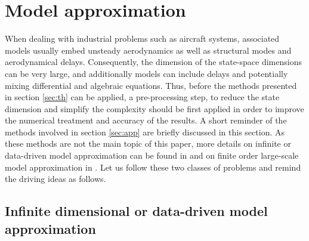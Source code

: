 \documentclass[graybox]{svmult}
\begin{document}
\section{Model approximation}\label{sec:mr}

When dealing with industrial problems such as aircraft systems, associated models usually embed unsteady aerodynamics as well as structural modes and aerodynamical delays. Consequently, the dimension of the  state-space dimensions can be very large, and additionally models can include delays and potentially mixing differential and algebraic equations. Thus, before the methods presented in section \ref{sec:th} can be applied, a pre-processing step, to reduce the state dimension and simplify the complexity should be first applied in order to improve the numerical treatment and accuracy of the results. A short reminder of the methods involved in section \ref{sec:app} are briefly discussed in this section. As these methods are not the main topic of this paper, more details on infinite or data-driven model approximation can be found in \cite{AntoulasSurvey:2016,DalmasECC:2016,Meyer:2016} and on finite order large-scale model approximation in \cite{AntoulasBook:2005,GugercinSIAM:2008}.  Let us follow these two classes of problems and remind the driving ideas as follows.

\subsection{Infinite  dimensional or data-driven model approximation}\label{sec:app_a}
\end{document}
